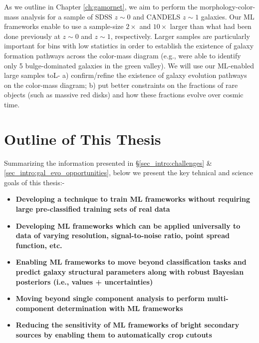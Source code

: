 As we outline in Chapter \ref{ch:gamornet}, we aim to perform the morphology-color-mass analysis for a sample of SDSS $z\sim0$ and CANDELS $z\sim1$ galaxies. Our ML frameworks enable to use a sample-size $2\times$ and $10\times$ larger than what had been done previously at $z\sim0$ and $z\sim1$, respectively. Larger samples are particularly important for bins with low statistics in order to establish the existence of galaxy formation pathways across the color-mass diagram (e.g., \cite{powell_17} were able to identify only 5 bulge-dominated galaxies in the green valley). We will use our ML-enabled large samples toL- a) confirm/refine the existence of galaxy evolution pathways on the color-mass diagram; b) put better constraints on the fractions of rare objects (such as massive red disks) and how these fractions evolve over cosmic time. 


\section{Outline of This Thesis} \label{sec_intro:thesis_outline}

Summarizing the information presented in \S \ref{sec_intro:challenges} \& \ref{sec_intro:gal_evo_opportunities}, below we present the key tehnical and science goals of this thesis:-

\begin{tcolorbox}[breakable,colback=blue!5!white,colframe=blue!75!black,title=\textbf{Key Technical Goals}]
\begin{itemize}
 \setlength\itemsep{-0.1em}
\item \textbf{Developing a technique to train ML frameworks without requiring large pre-classified training sets of real data}
\item \textbf{Developing ML frameworks which can be applied universally to data of varying resolution, signal-to-noise ratio, point spread function, etc.}
\item \textbf{Enabling ML frameworks to move beyond classification tasks and predict galaxy structural parameters along with robust Bayesian posteriors (i.e., values + uncertainties)}
\item \textbf{Moving beyond single component analysis to perform multi-component determination with ML frameworks}
\item \textbf{Reducing the sensitivity of ML frameworks of bright secondary sources by enabling them to automatically crop cutouts}
\end{itemize}
\end{tcolorbox}

